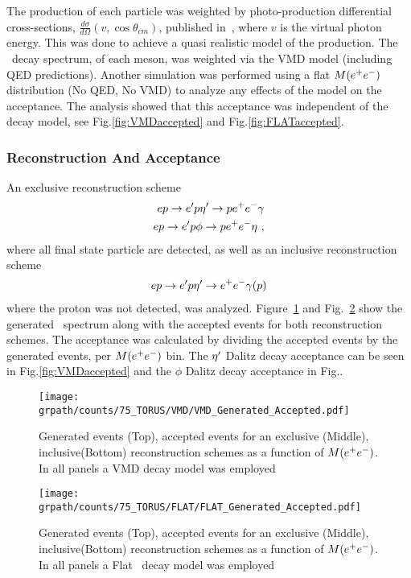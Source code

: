 \indent The production of each particle was weighted by photo-production 
differential cross-sections, $\frac{d\sigma}{d\Omega}(v,\cos\theta_{cm})$, published in~\cite{Williams}, where $v$ is the virtual photon energy. This was done to achieve a quasi realistic model of the production. The \epemT \  decay spectrum, of each meson, was weighted via the VMD model (including QED predictions). Another simulation was performed using a flat $M(\epem)$ distribution (No QED, No VMD) to analyze any effects of the model on the \epemT acceptance. The analysis showed that this acceptance was independent of the decay model, see Fig.\ref{fig:VMDaccepted} and Fig.\ref{fig:FLATaccepted}.
\subsubsection{Reconstruction And Acceptance}\label{sec.reconstruction}
An exclusive reconstruction scheme
\begin{align}
ep\to e'p \eta^{\prime} \rightarrow p e^+e^- \gamma  \\
ep\to e'p \phi \rightarrow p e^+e^- \eta \ ,
\end{align}
where all final state particle are detected, as well as an inclusive reconstruction scheme
\begin{align}
ep\to e'p \eta^{\prime} \rightarrow e^+e^- \gamma (p) \\
\end{align}
where the proton was not detected, was analyzed. Figure~\ref{fig:VMD} and Fig.~\ref{fig:FLAT} show the generated \epemT \ spectrum along with the accepted events for both reconstruction schemes. The acceptance was calculated by dividing the accepted events by the generated events, per $M(\epem)$ bin. The $\eta^{\prime}$ Dalitz decay acceptance can be seen in Fig.\ref{fig:VMDaccepted} and the $\phi$ Dalitz decay acceptance in Fig..
\begin{figure}[h!]\begin{center}
		\texttt{[image: \\grpath/counts/75\_TORUS/VMD/VMD\_Generated\_Accepted.pdf]}
		\caption[Generated and Accepted counts, as a function of $M(\epem)$]{\label{fig:VMD}{Generated events (Top), accepted events for an exclusive (Middle), inclusive(Bottom) reconstruction schemes as a function of $M(\epem)$. In all panels a VMD decay model was employed}}
\end{center}\end{figure}
\begin{figure}[h!]\begin{center}
			\texttt{[image: \\grpath/counts/75\_TORUS/FLAT/FLAT\_Generated\_Accepted.pdf]}
			\caption[Generated and Accepted counts, as a function of $M(\epem)$]{\label{fig:FLAT}{Generated events (Top), accepted events for an exclusive (Middle), inclusive(Bottom) reconstruction schemes as a function of $M(\epem)$. In all panels a Flat \epemT \ decay model was employed}}
\end{center}\end{figure}
\FloatBarrier

